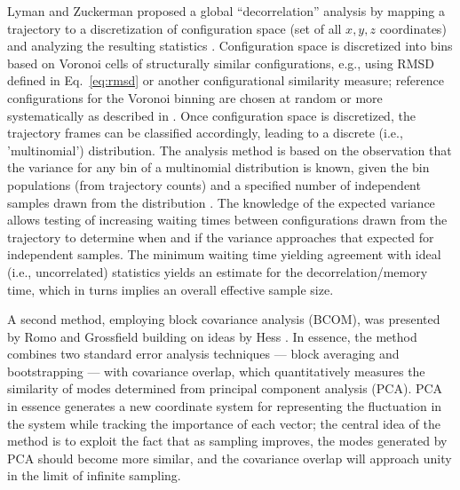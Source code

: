 Lyman and Zuckerman proposed a global ``decorrelation'' analysis by mapping a trajectory to a discretization of configuration space (set of all $x, y, z$ coordinates) and analyzing the resulting statistics \cite{Lyman2007a}.
Configuration space is discretized into bins based on Voronoi cells of structurally similar configurations,  e.g., using RMSD defined in Eq.\ \eqref{eq:rmsd} or another configurational similarity measure; reference configurations for the Voronoi binning are chosen at random or more systematically as described in \cite{Lyman2007a}.
Once configuration space is discretized, the trajectory frames can be classified accordingly, leading to a discrete (i.e., 'multinomial') distribution.
The analysis method is based on the observation that the variance for any bin of a multinomial distribution is known, given the bin populations (from trajectory counts) and a specified number of independent samples drawn from the distribution \cite{Lyman2007a}.
The knowledge of the expected variance allows testing of increasing waiting times between configurations drawn from the trajectory to determine when and if the variance approaches that expected for independent samples.
The minimum waiting time yielding agreement with ideal (i.e., uncorrelated) statistics yields an estimate for the decorrelation/memory time, which in turns implies an overall effective sample size. 



A second method, employing block covariance analysis (BCOM), was presented by Romo and Grossfield \cite{Romo2011} building on ideas by Hess \cite{Hess2002}.  In essence, the method combines two standard error analysis techniques --- block averaging \cite{Flyvbjerg-1989} and bootstrapping \cite{Tibshirani1998} --- with covariance overlap, which quantitatively measures the similarity of modes determined from principal component analysis (PCA)\cite{Hess2002}.  PCA in essence generates a new coordinate system for representing the fluctuation in the system while tracking the importance of each vector; the central idea of the method is to exploit the fact that as sampling improves, the modes generated by PCA should become more similar, and the covariance overlap will approach unity in the limit of infinite sampling.

